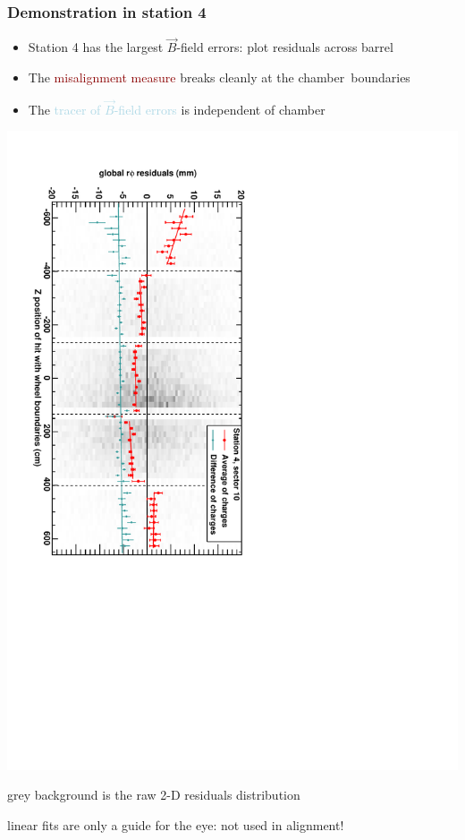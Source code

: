 \documentclass[compress]{beamer}
\begin{document}
\begin{frame}
\frametitle{Demonstration in station 4}

\begin{itemize}
\item Station 4 has the largest $\vec{B}$-field errors: plot residuals across barrel
\item The \textcolor{darkred}{misalignment measure} breaks cleanly at the \mbox{chamber boundaries\hspace{-1 cm}}
\item The \textcolor{lightblue}{tracer of $\vec{B}$-field errors} is independent of chamber
\end{itemize}

\includegraphics[height=\linewidth, angle=90]{demo_of_bfield.pdf}

\scriptsize grey background is the raw 2-D residuals distribution

linear fits are only a guide for the eye: not used in alignment!
\end{frame}
\end{document}
